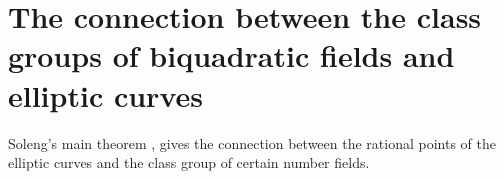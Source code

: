 \documentclass[12pt, 14paper]{amsart}
\theoremstyle{plain}
\newtheorem{theorem}[subsection]{Theorem}
\numberwithin{equation}{section}
\newcommand \ZZ {{\mathbb Z}}
\newcommand \QQ {{\mathbb Q}}
\begin{document}
\section{The connection between the class groups of biquadratic fields and elliptic curves}
Soleng's main theorem \cite{S}, gives the connection between the rational points of the elliptic curves and the class group of certain number fields. 






\end{document}
